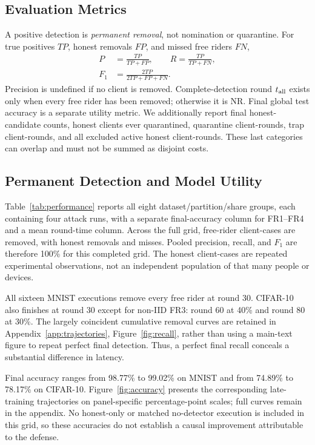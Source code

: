 \documentclass[conference]{IEEEtran}
\begin{document}
\subsection{Evaluation Metrics}
A positive detection is \emph{permanent removal}, not nomination or quarantine.
For true positives $TP$, honest removals $FP$, and missed free riders $FN$,
\begin{equation}
 \begin{aligned}
 P&=\frac{TP}{TP+FP},\qquad R=\frac{TP}{TP+FN},\\
 F_1&=\frac{2TP}{2TP+FP+FN}.
 \end{aligned}
\end{equation}
Precision is undefined if no client is removed. Complete-detection round
$t_{\rm all}$ exists only when every free rider has been removed; otherwise it
is NR. Final global test accuracy is a separate utility metric. We additionally
report final honest-candidate counts, honest clients ever quarantined, quarantine
client-rounds, trap client-rounds, and all excluded active honest client-rounds.
These last categories can overlap and must not be summed as disjoint costs.

\subsection{Permanent Detection and Model Utility}
Table~\ref{tab:performance} reports all eight dataset/partition/share groups,
each containing four attack runs, with a separate final-accuracy column for
FR1--FR4 and a mean round-time column. Across the full grid, \StudyTP{} free-rider
client-cases are removed, with \StudyFP{} honest removals and \StudyFN{} misses.
Pooled precision, recall, and $F_1$ are therefore 100\% for this completed grid.
The \StudyHonest{} honest client-cases are repeated experimental observations,
not an independent population of that many people or devices.

All sixteen MNIST executions remove every free rider at round 30. CIFAR-10
also finishes at round 30 except for non-IID FR3: round 60 at 40\% and round 80
at 30\%. The largely coincident cumulative removal curves are retained in
Appendix~\ref{app:trajectories}, Figure~\ref{fig:recall}, rather than using a
main-text figure to repeat perfect final detection. Thus, a perfect final recall
conceals a substantial difference in latency.

Final accuracy ranges from 98.77\% to 99.02\% on MNIST and from 74.89\% to
78.17\% on CIFAR-10. Figure~\ref{fig:accuracy} presents the corresponding
late-training trajectories on panel-specific percentage-point scales; full
curves remain in the appendix. No honest-only or matched no-detector execution is
included in this grid, so these accuracies do not establish a causal improvement
attributable to the defense.

\end{document}

